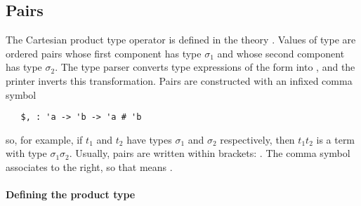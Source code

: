 \subsection{Pairs}\label{prod}

%
The Cartesian  product  type  operator
%
%
%
%
is defined in the theory . Values of type
 are ordered pairs whose first
component has type $\sigma_1$ and whose second component has type
$\sigma_2$.  The \HOL{} type parser
%
%
converts type expressions of the form 
%
%
into ,
%
%
and the printer inverts this transformation. Pairs
%
%
are constructed with an infixed comma symbol

\begin{hol}
\begin{verbatim}
   $, : 'a -> 'b -> 'a # 'b
\end{verbatim}
\end{hol}

\noindent
so, for example, if $t_1$ and $t_2$ have types $\sigma_1$ and
$\sigma_2$ respectively, then $t_1$\ml{,}$t_2$ is a term with type
$\sigma_1$\holtxt{\#}$\sigma_2$. Usually, pairs are written within
brackets: . The comma symbol associates
%
%
to the right, so that  means
.

\paragraph {Defining the product type}

